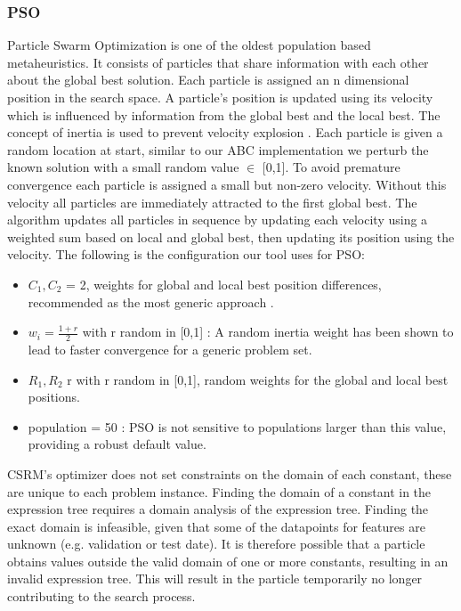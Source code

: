 \subsubsection{PSO}
Particle Swarm Optimization \cite{PSO} is one of the oldest population based metaheuristics. It consists of particles that share information with each other about the global best solution.
Each particle is assigned an n dimensional position in the search space. A particle's position is updated using its velocity which is influenced by information from the global best and the local best. The concept of inertia is used to prevent velocity explosion \cite{PSOExplosion}.
Each particle is given a random location at start, similar to our ABC implementation we perturb the known solution with a small random value $\in$ [0,1].
To avoid premature convergence each particle is assigned a small but non-zero velocity. Without this velocity all particles are immediately attracted to the first global best. 
The algorithm updates all particles in sequence by updating each velocity using a weighted sum based on local and global best, then updating its position using the velocity.
The following is the configuration our tool uses for PSO:
\begin{itemize}
\item $C_1, C_2$ = 2, weights for global and local best position differences, recommended as the most generic approach \cite{PSOParameter}.
\item $w_i = \frac{1 + r}{2}$ with r random in [0,1] : A random inertia weight has been shown \cite{PSOInertia} to lead to faster convergence for a generic problem set.
\item $R_1, R_2$ r with r random in [0,1], random weights for the global and local best positions. 
\item population = 50 : PSO is not sensitive to populations larger than this value, providing a robust default value. \cite{SwarmIntelligence}
\end{itemize}
CSRM's optimizer does not set constraints on the domain of each constant, these are unique to each problem instance. 
Finding the domain of a constant in the expression tree requires a domain analysis of the expression tree. Finding the exact domain is infeasible, given that some of the datapoints for features are unknown (e.g. validation or test date). It is therefore possible that a particle obtains values outside the valid domain of one or more constants, resulting in an invalid expression tree. This will result in the particle temporarily no longer contributing to the search process.
